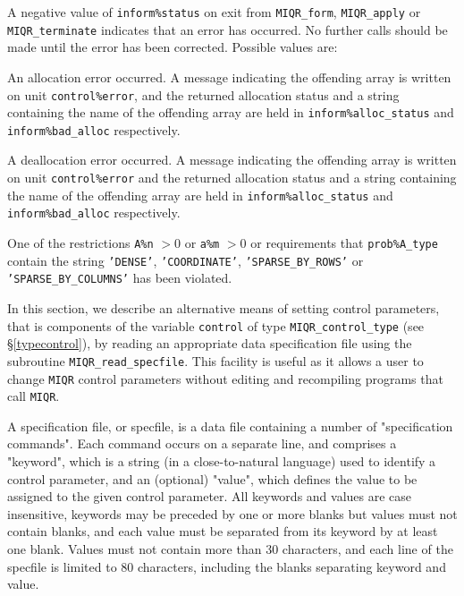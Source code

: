 \documentclass{galahad}
\newcommand{\packagename}{MIQR}
\begin{document}

\galerrors
A negative value of {\tt inform\%status} on exit from
{\tt \packagename\_form},
{\tt \packagename\_apply}
or
{\tt \packagename\_terminate}
indicates that an error has occurred. No further calls should be made
until the error has been corrected. Possible values are:

\begin{description}

 An allocation error occurred.
A message indicating the offending
array is written on unit {\tt control\%error}, and the returned allocation
status and a string containing the name of the offending array
are held in {\tt inform\%alloc\_\-status}
and {\tt inform\%bad\_alloc} respectively.

 A deallocation error occurred.
A message indicating the offending
array is written on unit {\tt control\%error} and the returned allocation
status and a string containing the name of the offending array
are held in {\tt inform\%alloc\_\-status}
and {\tt inform\%bad\_alloc} respectively.

 One of the restrictions
   {\tt A\%n} $> 0$ or {\tt a\%m} $> 0$
    or requirements that {\tt prob\%A\_type}
    contain the string
    {\tt 'DENSE'}, {\tt 'COORDINATE'}, {\tt 'SPARSE\_BY\_ROWS'}
    or {\tt 'SPARSE\_BY\_COLUMNS'}
    has been violated.

\end{description}


\galfeatures
\noindent In this section, we describe an alternative means of setting
control parameters, that is components of the variable {\tt control} of type
{\tt \packagename\_control\_type}
(see \S\ref{typecontrol}),
by reading an appropriate data specification file using the
subroutine {\tt \packagename\_read\_specfile}. This facility
is useful as it allows a user to change  {\tt \packagename} control parameters
without editing and recompiling programs that call {\tt \packagename}.

A specification file, or specfile, is a data file containing a number of
"specification commands". Each command occurs on a separate line,
and comprises a "keyword",
which is a string (in a close-to-natural language) used to identify a
control parameter, and
an (optional) "value", which defines the value to be assigned to the given
control parameter. All keywords and values are case insensitive,
keywords may be preceded by one or more blanks but
values must not contain blanks, and
each value must be separated from its keyword by at least one blank.
Values must not contain more than 30 characters, and
each line of the specfile is limited to 80 characters,
including the blanks separating keyword and value.
\end{document}
